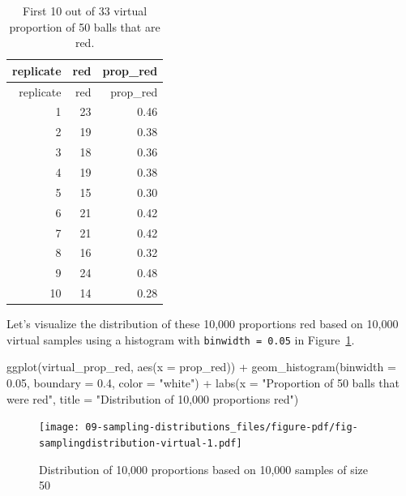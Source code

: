 \documentclass[
  letterpaper,
  DIV=11,
  numbers=noendperiod]{scrreprt}
\newenvironment{Shaded}{\begin{snugshade}}{\end{snugshade}}
\newcommand{\AttributeTok}[1]{\textcolor[rgb]{0.40,0.45,0.13}{#1}}
\newcommand{\FloatTok}[1]{\textcolor[rgb]{0.68,0.00,0.00}{#1}}
\newcommand{\FunctionTok}[1]{\textcolor[rgb]{0.28,0.35,0.67}{#1}}
\newcommand{\NormalTok}[1]{\textcolor[rgb]{0.00,0.23,0.31}{#1}}
\newcommand{\SpecialCharTok}[1]{\textcolor[rgb]{0.37,0.37,0.37}{#1}}
\newcommand{\StringTok}[1]{\textcolor[rgb]{0.13,0.47,0.30}{#1}}
\theoremstyle{definition}
\theoremstyle{remark}
\begin{document}
\hypertarget{tbl-virtualred}{}
\begin{longtable}[]{@{}rrr@{}}
\caption{\label{tbl-virtualred}First 10 out of 33 virtual proportion of
50 balls that are red.}\tabularnewline
\toprule()
replicate & red & prop\_red \\
\midrule()
\endfirsthead
\toprule()
replicate & red & prop\_red \\
\midrule()
\endhead
1 & 23 & 0.46 \\
2 & 19 & 0.38 \\
3 & 18 & 0.36 \\
4 & 19 & 0.38 \\
5 & 15 & 0.30 \\
6 & 21 & 0.42 \\
7 & 21 & 0.42 \\
8 & 16 & 0.32 \\
9 & 24 & 0.48 \\
10 & 14 & 0.28 \\
\bottomrule()
\end{longtable}

Let's visualize the distribution of these 10,000 proportions red based
on 10,000 virtual samples using a histogram with
\texttt{binwidth\ =\ 0.05} in
Figure~\ref{fig-samplingdistribution-virtual}.

\begin{Shaded}
\begin{Highlighting}[]
\FunctionTok{ggplot}\NormalTok{(virtual\_prop\_red, }\FunctionTok{aes}\NormalTok{(}\AttributeTok{x =}\NormalTok{ prop\_red)) }\SpecialCharTok{+}
  \FunctionTok{geom\_histogram}\NormalTok{(}\AttributeTok{binwidth =} \FloatTok{0.05}\NormalTok{, }\AttributeTok{boundary =} \FloatTok{0.4}\NormalTok{, }\AttributeTok{color =} \StringTok{"white"}\NormalTok{) }\SpecialCharTok{+}
  \FunctionTok{labs}\NormalTok{(}\AttributeTok{x =} \StringTok{"Proportion of 50 balls that were red"}\NormalTok{, }
       \AttributeTok{title =} \StringTok{"Distribution of 10,000 proportions red"}\NormalTok{) }
\end{Highlighting}
\end{Shaded}

\begin{figure}

{\centering \texttt{[image: 09-sampling-distributions\_files/figure-pdf/fig-samplingdistribution-virtual-1.pdf]}

}

\caption{\label{fig-samplingdistribution-virtual}Distribution of 10,000
proportions based on 10,000 samples of size 50}

\end{figure}
\end{document}
